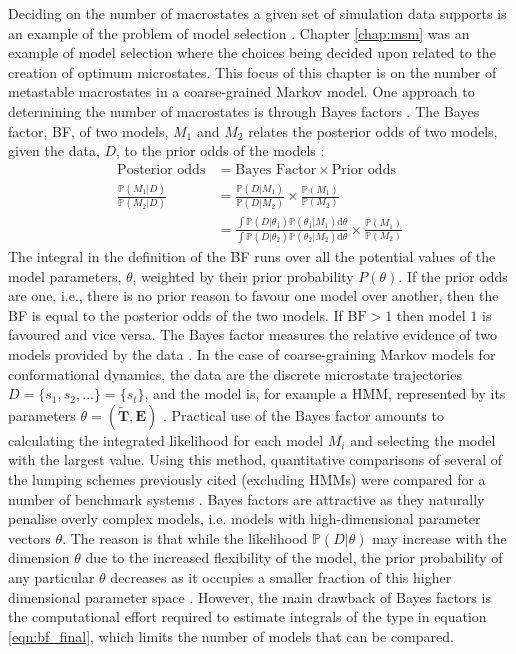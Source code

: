 Deciding on the number of macrostates a given set of simulation data supports is an example of the problem of model selection \cite[chapter 6]{friedman2001elements}\cite{claeskens_hjort_2008}. Chapter \ref{chap:msm} was an example of model selection where the choices being decided upon related to the creation of optimum microstates.  This focus of this chapter is on the number of metastable macrostates in a coarse-grained Markov model. One approach to determining the number of macrostates is through Bayes factors \cite{kassBayesFactors1995}. The Bayes factor, BF, of two models, $M_{1}$ and $M_{2}$ relates the posterior odds of two models, given the data, $D$, to the prior odds of the models \cite{kassBayesFactors1995}:
\begin{align}
\text{Posterior odds} & = \text{Bayes Factor} \times \text{Prior odds} \\
\frac{ \mathbb{P}(M_1|D) }{ \mathbb{P}(M_2|D) } & = \frac{ \mathbb{P}(D|M_1) }{ \mathbb{P}(D|M_2) } \times \frac{ \mathbb{P}(M_1) }{ \mathbb{P}(M_2) }\\
& = \frac{\int \mathbb{P}\left( D | \theta_{1} \right)\mathbb{P}(\theta_{1}|M_{1}) \mathrm{d}\theta}{\int \mathbb{P}\left( D | \theta_{2} \right)\mathbb{P}(\theta_{2}|M_{2}) \mathrm{d}\theta} \times \frac{\mathbb{P}(M_1)}{\mathbb{P}(M_2)}\label{eqn:bf_final}
\end{align}
The integral in the definition of the BF runs over all the potential values of the model parameters, $\theta$, weighted by their prior probability $P(\theta)$. If the prior odds are one, i.e., there is no prior reason to favour one model over another, then the BF is equal to the posterior odds of the two models. If $\textrm{BF} > 1$ then model $1$ is favoured and vice versa. The Bayes factor measures the relative evidence of two models provided by the data \cite{kassBayesFactors1995}. In the case of coarse-graining Markov models for conformational dynamics, the data are the discrete microstate trajectories $D = \{s_1, s_2, ...\}= \{s_t\}$, and the model is, for example a HMM, represented by its parameters $\theta = (\tilde{\mathbf{T}}, \mathbf{E})$ \cite{bacalladoBayesianComparisonMarkov2009a}. Practical use of the Bayes factor amounts to calculating the integrated likelihood  for each model $M_i$ and selecting the model with the largest value. Using this method, quantitative comparisons of several of the lumping schemes previously cited  (excluding HMMs) were  compared for a number of benchmark systems \cite{bowmanQuantitativeComparisonAlternative2013}. Bayes factors are attractive as they naturally penalise overly complex models, i.e. models with high-dimensional parameter vectors $\theta$. The reason is that while the likelihood $\mathbb{P}(D|\theta)$ may increase with the dimension $\theta$ due to the increased flexibility of the model, the prior probability of any particular $\theta$ decreases as it occupies a smaller fraction of this higher dimensional parameter space \cite{kassBayesFactors1995,mackay2003information}. However, the main drawback of Bayes factors is the computational effort required to estimate integrals of the type in equation \ref{eqn:bf_final}, which limits the number of models that can be compared. 


